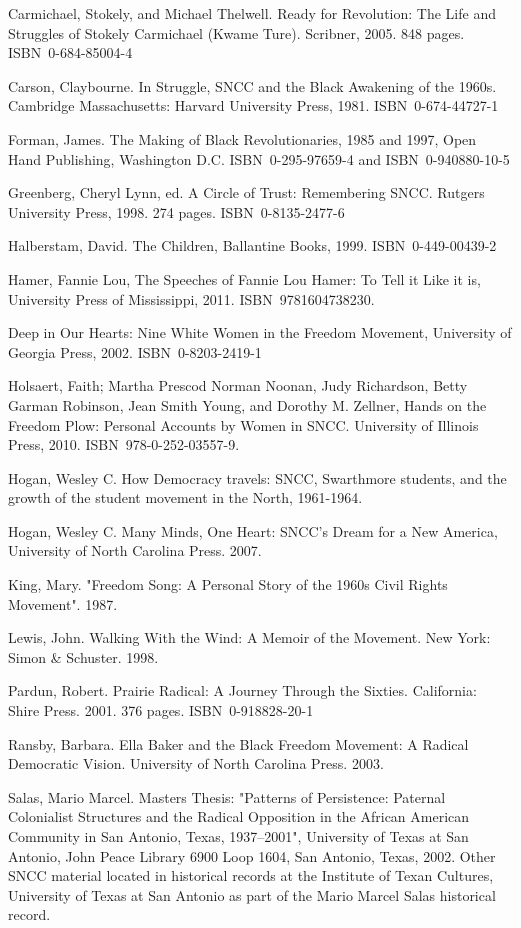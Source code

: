 Carmichael, Stokely, and Michael Thelwell. Ready for Revolution: The
Life and Struggles of Stokely Carmichael (Kwame Ture). Scribner, 2005.
848 pages. ISBN~0-684-85004-4

Carson, Claybourne. In Struggle, SNCC and the Black Awakening of the
1960s. Cambridge Massachusetts: Harvard University Press, 1981.
ISBN~0-674-44727-1

Forman, James. The Making of Black Revolutionaries, 1985 and 1997, Open
Hand Publishing, Washington D.C. ISBN~0-295-97659-4 and
ISBN~0-940880-10-5

Greenberg, Cheryl Lynn, ed. A Circle of Trust: Remembering SNCC. Rutgers
University Press, 1998. 274 pages. ISBN~0-8135-2477-6

Halberstam, David. The Children, Ballantine Books, 1999.
ISBN~0-449-00439-2

Hamer, Fannie Lou, The Speeches of Fannie Lou Hamer: To Tell it Like it
is, University Press of Mississippi, 2011. ISBN~9781604738230.

Deep in Our Hearts: Nine White Women in the Freedom Movement, University
of Georgia Press, 2002. ISBN~0-8203-2419-1

Holsaert, Faith; Martha Prescod Norman Noonan, Judy Richardson, Betty
Garman Robinson, Jean Smith Young, and Dorothy M. Zellner, Hands on the
Freedom Plow: Personal Accounts by Women in SNCC. University of Illinois
Press, 2010. ISBN~978-0-252-03557-9.

Hogan, Wesley C. How Democracy travels: SNCC, Swarthmore students, and
the growth of the student movement in the North, 1961-1964.

Hogan, Wesley C. Many Minds, One Heart: SNCC's Dream for a New America,
University of North Carolina Press. 2007.

King, Mary. "Freedom Song: A Personal Story of the 1960s Civil Rights
Movement". 1987.

Lewis, John. Walking With the Wind: A Memoir of the Movement. New York:
Simon \& Schuster. 1998.

Pardun, Robert. Prairie Radical: A Journey Through the Sixties.
California: Shire Press. 2001. 376 pages. ISBN~0-918828-20-1

Ransby, Barbara. Ella Baker and the Black Freedom Movement: A Radical
Democratic Vision. University of North Carolina Press. 2003.

Salas, Mario Marcel. Masters Thesis: "Patterns of Persistence: Paternal
Colonialist Structures and the Radical Opposition in the African
American Community in San Antonio, Texas, 1937--2001", University of
Texas at San Antonio, John Peace Library 6900 Loop 1604, San Antonio,
Texas, 2002. Other SNCC material located in historical records at the
Institute of Texan Cultures, University of Texas at San Antonio as part
of the Mario Marcel Salas historical record.

